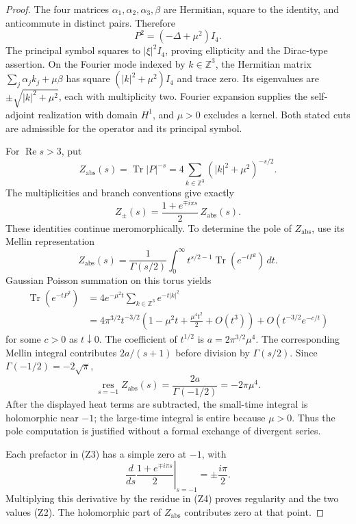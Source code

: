 \begin{proof}
The four matrices \(\alpha_1,\alpha_2,\alpha_3,\beta\) are
Hermitian, square to the identity, and anticommute in distinct pairs.
Therefore
\[
 P^2=(-\Delta+\mu^2)I_4.
\]
The principal symbol squares to \(|\xi|^2I_4\), proving ellipticity
and the Dirac-type assertion. On the Fourier mode indexed by
\(k\in\mathbb Z^3\), the Hermitian matrix
\(\sum_j\alpha_jk_j+\mu\beta\) has square
\((|k|^2+\mu^2)I_4\) and trace zero. Its eigenvalues are
\(\pm\sqrt{|k|^2+\mu^2}\), each with multiplicity two. Fourier
expansion supplies the self-adjoint realization with domain \(H^1\),
and \(\mu>0\) excludes a kernel. Both stated cuts are admissible for
the operator and its principal symbol.

For \(\operatorname{Re}s>3\), put
\[
 Z_{\mathrm{abs}}(s)=\operatorname{Tr}|P|^{-s}
 =4\sum_{k\in\mathbb Z^3}(|k|^2+\mu^2)^{-s/2}.
\]
The multiplicities and branch conventions give exactly
\[
 Z_\pm(s)=\frac{1+e^{\mp i\pi s}}2\,Z_{\mathrm{abs}}(s). \tag{Z3}
\]
These identities continue meromorphically. To determine the pole of
\(Z_{\mathrm{abs}}\), use its Mellin representation
\[
 Z_{\mathrm{abs}}(s)
 =\frac1{\Gamma(s/2)}\int_0^\infty
 t^{s/2-1}\operatorname{Tr}(e^{-tP^2})\,dt.
\]
Gaussian Poisson summation on this torus yields
\[
\begin{split}
 \operatorname{Tr}(e^{-tP^2})
 &=4e^{-\mu^2t}\sum_{k\in\mathbb Z^3}e^{-t|k|^2}\\
 &=4\pi^{3/2}t^{-3/2}
 \left(1-\mu^2t+\frac{\mu^4t^2}{2}+O(t^3)\right)
   +O\!\left(t^{-3/2}e^{-c/t}\right)
\end{split}
\]
for some \(c>0\) as \(t\downarrow0\). The coefficient of
\(t^{1/2}\) is \(a=2\pi^{3/2}\mu^4\). The corresponding Mellin
integral contributes \(2a/(s+1)\) before division by
\(\Gamma(s/2)\). Since \(\Gamma(-1/2)=-2\sqrt\pi\),
\[
 \operatorname*{res}_{s=-1}Z_{\mathrm{abs}}(s)
 =\frac{2a}{\Gamma(-1/2)}=-2\pi\mu^4. \tag{Z4}
\]
After the displayed heat terms are subtracted, the small-time integral
is holomorphic near \(-1\); the large-time integral is entire because
\(\mu>0\). Thus the pole computation is justified without a formal
exchange of divergent series.

Each prefactor in (Z3) has a simple zero at \(-1\), with
\[
 \left.\frac{d}{ds}\frac{1+e^{\mp i\pi s}}2\right|_{s=-1}
 =\pm\frac{i\pi}{2}.
\]
Multiplying this derivative by the residue in (Z4) proves regularity
and the two values (Z2). The holomorphic part of
\(Z_{\mathrm{abs}}\) contributes zero at that point.
\end{proof}

